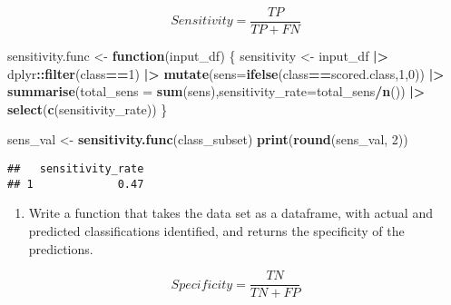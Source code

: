 \documentclass[
]{article}
\newenvironment{Shaded}{\begin{snugshade}}{\end{snugshade}}
\newcommand{\AttributeTok}[1]{\textcolor[rgb]{0.13,0.29,0.53}{#1}}
\newcommand{\ControlFlowTok}[1]{\textcolor[rgb]{0.13,0.29,0.53}{\textbf{#1}}}
\newcommand{\DecValTok}[1]{\textcolor[rgb]{0.00,0.00,0.81}{#1}}
\newcommand{\FunctionTok}[1]{\textcolor[rgb]{0.13,0.29,0.53}{\textbf{#1}}}
\newcommand{\NormalTok}[1]{#1}
\newcommand{\OtherTok}[1]{\textcolor[rgb]{0.56,0.35,0.01}{#1}}
\newcommand{\SpecialCharTok}[1]{\textcolor[rgb]{0.81,0.36,0.00}{\textbf{#1}}}
\providecommand{\tightlist}{%
  \setlength{\itemsep}{0pt}\setlength{\parskip}{0pt}}
\begin{document}
\[Sensitivity = \frac{TP}{TP + FN}\]

\begin{Shaded}
\begin{Highlighting}[]
\NormalTok{sensitivity.func }\OtherTok{\textless{}{-}} \ControlFlowTok{function}\NormalTok{(input\_df) \{}
\NormalTok{    sensitivity }\OtherTok{\textless{}{-}}\NormalTok{ input\_df }\SpecialCharTok{|\textgreater{}}\NormalTok{ dplyr}\SpecialCharTok{::}\FunctionTok{filter}\NormalTok{(class}\SpecialCharTok{==}\DecValTok{1}\NormalTok{) }\SpecialCharTok{|\textgreater{}} \FunctionTok{mutate}\NormalTok{(}\AttributeTok{sens=}\FunctionTok{ifelse}\NormalTok{(class}\SpecialCharTok{==}\NormalTok{scored.class,}\DecValTok{1}\NormalTok{,}\DecValTok{0}\NormalTok{)) }\SpecialCharTok{|\textgreater{}} 
        \FunctionTok{summarise}\NormalTok{(}\AttributeTok{total\_sens =} \FunctionTok{sum}\NormalTok{(sens),}\AttributeTok{sensitivity\_rate=}\NormalTok{total\_sens}\SpecialCharTok{/}\FunctionTok{n}\NormalTok{()) }\SpecialCharTok{|\textgreater{}} \FunctionTok{select}\NormalTok{(}\FunctionTok{c}\NormalTok{(sensitivity\_rate))}
\NormalTok{\}}

\NormalTok{sens\_val }\OtherTok{\textless{}{-}} \FunctionTok{sensitivity.func}\NormalTok{(class\_subset)}
\FunctionTok{print}\NormalTok{(}\FunctionTok{round}\NormalTok{(sens\_val, }\DecValTok{2}\NormalTok{))}
\end{Highlighting}
\end{Shaded}

\begin{verbatim}
##   sensitivity_rate
## 1             0.47
\end{verbatim}

\begin{enumerate}
\def\labelenumi{\arabic{enumi}.}
\setcounter{enumi}{6}
\tightlist
\item
  Write a function that takes the data set as a dataframe, with actual
  and predicted classifications identified, and returns the specificity
  of the predictions.
\end{enumerate}

\[Specificity = \frac{TN}{TN + FP}\]
\end{document}
